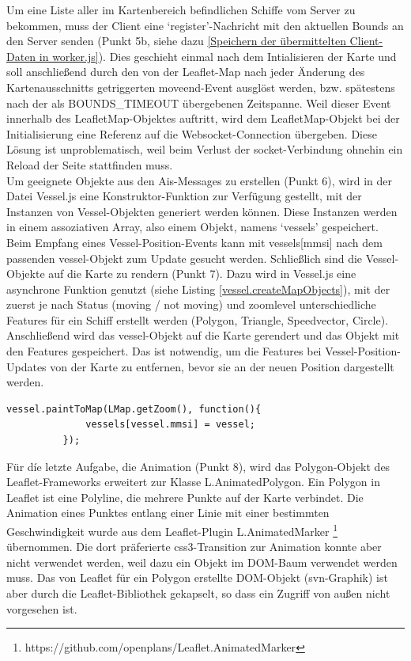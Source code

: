 Um eine Liste aller im Kartenbereich befindlichen Schiffe vom Server zu bekommen, muss der Client eine ‘register’-Nachricht mit den aktuellen Bounds an den Server senden (Punkt 5b, siehe dazu \ref{Speichern der übermittelten Client-Daten in worker.js}).
Dies geschieht einmal nach dem Intialisieren der Karte und soll anschließend durch den von der Leaflet-Map nach jeder Änderung des Kartenausschnitts getriggerten moveend-Event ausglöst werden, bzw. spätestens nach der als BOUNDS\_TIMEOUT übergebenen Zeitspanne. Weil dieser Event innerhalb des LeafletMap-Objektes auftritt, wird dem LeafletMap-Objekt bei der Initialisierung eine Referenz auf die Websocket-Connection übergeben. Diese Lösung ist unproblematisch, weil beim Verlust der socket-Verbindung ohnehin ein Reload der Seite stattfinden muss.\\
Um geeignete Objekte aus den Ais-Messages zu erstellen (Punkt 6), wird in der Datei Vessel.js eine Konstruktor-Funktion zur Verfügung gestellt, mit der Instanzen von Vessel-Objekten generiert werden können. Diese Instanzen werden in einem assoziativen Array, also einem Objekt, namens ‘vessels’ gespeichert. Beim Empfang eines Vessel-Position-Events kann mit vessels[mmsi] nach dem passenden vessel-Objekt zum Update gesucht werden.
Schließlich sind die Vessel-Objekte auf die Karte zu rendern (Punkt 7). Dazu wird in Vessel.js eine asynchrone Funktion genutzt (siehe Listing \ref{vessel.createMapObjects}), mit der zuerst je nach Status (moving / not moving) und zoomlevel unterschiedliche Features für ein Schiff erstellt werden (Polygon, Triangle, Speedvector, Circle). Anschließend wird das vessel-Objekt auf die Karte gerendert und das Objekt mit den Features gespeichert. Das ist notwendig, um die Features bei Vessel-Position-Updates von der Karte zu entfernen, bevor sie an der neuen Position dargestellt werden.
\begin{lstlisting}[caption=Aufruf der public function paintToMap des Vessel-Objekts in ais-socket.io.js, label=vessel.paintToMap]
          vessel.paintToMap(LMap.getZoom(), function(){
              vessels[vessel.mmsi] = vessel;
          });
\end{lstlisting}

Für díe letzte Aufgabe, die Animation (Punkt 8), wird das Polygon-Objekt des Leaflet-Frameworks erweitert zur Klasse L.AnimatedPolygon. Ein Polygon in Leaflet ist eine Polyline, die mehrere Punkte auf der Karte verbindet. Die Animation eines Punktes entlang einer Linie mit einer bestimmten Geschwindigkeit wurde aus dem Leaflet-Plugin L.AnimatedMarker \footnote{\label{foot:2}https://github.com/openplans/Leaflet.AnimatedMarker} übernommen. Die dort präferierte css3-Transition zur Animation konnte aber nicht verwendet werden, weil dazu ein Objekt im DOM-Baum verwendet werden muss. Das von Leaflet für ein Polygon erstellte DOM-Objekt (svn-Graphik) ist aber durch die Leaflet-Bibliothek gekapselt, so dass ein Zugriff von außen nicht vorgesehen ist.  \\


